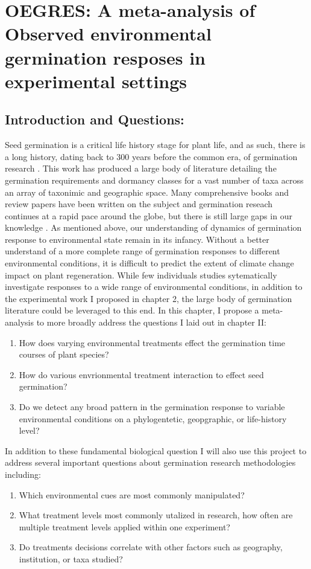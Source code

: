 \documentclass{article}\usepackage[]{graphicx}\usepackage[]{color}
\begin{document}
{\section*{OEGRES: A meta-analysis of Observed environmental germination resposes in experimental settings}
\subsection*{Introduction and Questions:}
\indent Seed germination is a critical life history stage for plant life, and as such, there is a long history, dating back to 300 years before the common era, of germination research \citep{Baskin2014}. This work has produced a large body of literature detailing the germination requirements and dormancy classes for a vast number of taxa across an array of taxonimic and geographic space. Many comprehensive books and review papers have been written on the subject and germination reseach continues at a rapid pace around the globe, but there is still large gaps in our knowledge \citep{Baskin2014}. As mentioned above, our understanding of  dynamics of germination response to environmental state remain in its infancy.  Without a better understand of a more complete range of germination responses to different environmental conditions, it is difficult to predict the extent of climate change impact on plant regeneration. While few individuals studies sytematically investigate responses to a wide range of environmental conditions, in addition to the experimental work I proposed in chapter 2, the large body of germination literature could be leveraged to this end. In this chapter, I propose a meta-analysis to more broadly address the questions I laid out in chapter II:
\begin{enumerate}
\item How does varying environmental treatments effect the germination time courses of plant species?
\item How do various envrionmental treatment interaction to effect seed germination?
\item Do we detect any broad pattern in the germination response to variable environmental conditions on a phylogentetic, geopgraphic, or life-history level?
\end{enumerate}
\indent In addition to these fundamental biological question I will also use this project to address several important questions about germination research methodologies including:
\begin{enumerate}
\item Which environmental cues are most commonly manipulated?
\item What treatment levels most commonly utalized in research, how often are multiple treatment levels applied within one experiment?
\item Do treatments decisions correlate with other factors such as geography, institution, or taxa studied?
\end{enumerate}
}
\end{document}
